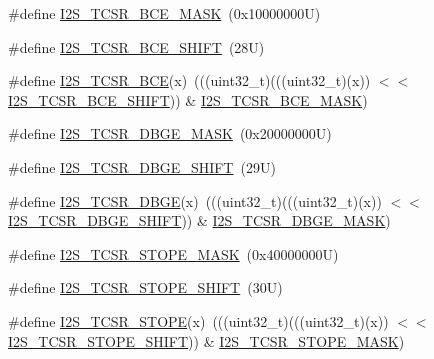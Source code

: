 \begin{DoxyCompactItemize}
\item 
\#define \mbox{\hyperlink{group___i2_s___register___masks_ga1a283a2875596890e8d014ba29a2d764}{I2\+S\+\_\+\+T\+C\+S\+R\+\_\+\+B\+C\+E\+\_\+\+M\+A\+SK}}~(0x10000000\+U)
\item 
\#define \mbox{\hyperlink{group___i2_s___register___masks_gabcf492ab7f9cc04accd4b8d144a195d8}{I2\+S\+\_\+\+T\+C\+S\+R\+\_\+\+B\+C\+E\+\_\+\+S\+H\+I\+FT}}~(28\+U)
\item 
\#define \mbox{\hyperlink{group___i2_s___register___masks_ga81b07774ec3fd2493e1c1812d5b675b9}{I2\+S\+\_\+\+T\+C\+S\+R\+\_\+\+B\+CE}}(x)~(((uint32\+\_\+t)(((uint32\+\_\+t)(x)) $<$$<$ \mbox{\hyperlink{group___i2_s___register___masks_gabcf492ab7f9cc04accd4b8d144a195d8}{I2\+S\+\_\+\+T\+C\+S\+R\+\_\+\+B\+C\+E\+\_\+\+S\+H\+I\+FT}})) \& \mbox{\hyperlink{group___i2_s___register___masks_ga1a283a2875596890e8d014ba29a2d764}{I2\+S\+\_\+\+T\+C\+S\+R\+\_\+\+B\+C\+E\+\_\+\+M\+A\+SK}})
\item 
\#define \mbox{\hyperlink{group___i2_s___register___masks_ga168b4f72e1d68208f211020224bc4f1d}{I2\+S\+\_\+\+T\+C\+S\+R\+\_\+\+D\+B\+G\+E\+\_\+\+M\+A\+SK}}~(0x20000000\+U)
\item 
\#define \mbox{\hyperlink{group___i2_s___register___masks_ga45053916a88f0ce8d3a0798b7529f976}{I2\+S\+\_\+\+T\+C\+S\+R\+\_\+\+D\+B\+G\+E\+\_\+\+S\+H\+I\+FT}}~(29\+U)
\item 
\#define \mbox{\hyperlink{group___i2_s___register___masks_ga68ef4ea76a14383e93fb581192065792}{I2\+S\+\_\+\+T\+C\+S\+R\+\_\+\+D\+B\+GE}}(x)~(((uint32\+\_\+t)(((uint32\+\_\+t)(x)) $<$$<$ \mbox{\hyperlink{group___i2_s___register___masks_ga45053916a88f0ce8d3a0798b7529f976}{I2\+S\+\_\+\+T\+C\+S\+R\+\_\+\+D\+B\+G\+E\+\_\+\+S\+H\+I\+FT}})) \& \mbox{\hyperlink{group___i2_s___register___masks_ga168b4f72e1d68208f211020224bc4f1d}{I2\+S\+\_\+\+T\+C\+S\+R\+\_\+\+D\+B\+G\+E\+\_\+\+M\+A\+SK}})
\item 
\#define \mbox{\hyperlink{group___i2_s___register___masks_ga2692628bf911b8951e8f77dbd6809f87}{I2\+S\+\_\+\+T\+C\+S\+R\+\_\+\+S\+T\+O\+P\+E\+\_\+\+M\+A\+SK}}~(0x40000000\+U)
\item 
\#define \mbox{\hyperlink{group___i2_s___register___masks_ga931d31ce7c806e53554e29d7cf0db6ed}{I2\+S\+\_\+\+T\+C\+S\+R\+\_\+\+S\+T\+O\+P\+E\+\_\+\+S\+H\+I\+FT}}~(30\+U)
\item 
\#define \mbox{\hyperlink{group___i2_s___register___masks_gacd5eb31f5368b5e55b8714521269280d}{I2\+S\+\_\+\+T\+C\+S\+R\+\_\+\+S\+T\+O\+PE}}(x)~(((uint32\+\_\+t)(((uint32\+\_\+t)(x)) $<$$<$ \mbox{\hyperlink{group___i2_s___register___masks_ga931d31ce7c806e53554e29d7cf0db6ed}{I2\+S\+\_\+\+T\+C\+S\+R\+\_\+\+S\+T\+O\+P\+E\+\_\+\+S\+H\+I\+FT}})) \& \mbox{\hyperlink{group___i2_s___register___masks_ga2692628bf911b8951e8f77dbd6809f87}{I2\+S\+\_\+\+T\+C\+S\+R\+\_\+\+S\+T\+O\+P\+E\+\_\+\+M\+A\+SK}})
$$
\end{DoxyCompactItemize}
